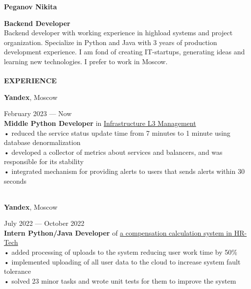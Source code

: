 \documentclass{article}
\begin{document}
\begin{vwcol}[widths={0.8,0.2},
 sep=.8cm, justify=flush,rule=0pt,indent=1em] 
\begin{spacing}{1.1}
\noindent\textbf{\Huge{Peganov Nikita}}\\
\end{spacing}
\noindent\textcolor[rgb]{0.1255,0.2902,0.7843}{\textbf{\Large{Backend Developer}}}\\
Backend developer with working experience in highload systems and project organization. Specialize in Python and Java with 3 years of production development experience. I am fond of creating IT-startups, generating ideas and learning new technologies. I prefer to work in Moscow.\\
\\
\noindent\textcolor[rgb]{0.1255,0.2902,0.7843}{\textbf{\Large{EXPERIENCE}}}\\
\begin{Large}
\textbf{Yandex}, Moscow
\end{Large}
\hspace{215pt}February 2023 — Now\\
\textbf{Middle Python Developer} in \href{https://infraevents.yandex.ru/}{Infrastructure L3 Management}\\
• reduced the service status update time from 7 minutes to 1 minute using database denormalization\\
• developed a collector of metrics about services and balancers, and was responsible for its stability\\
• integrated mechanism for providing alerts to users that sends alerts within 30 seconds\\
\\
\begin{Large}
\textbf{Yandex}, Moscow
\end{Large}
\hspace{200pt}July 2022 — October 2022\\
\textbf{Intern Python/Java Developer} of \href{https://yandex.cloud/ru/isv/hrtech}{a compensation calculation system in HR-Tech}\\
• added processing of uploads to the system reducing user work time by 50\%\\
• implemented uploading of all user data to the cloud to increase system fault tolerance\\
• solved 23 minor tasks and wrote unit tests for them to improve the system\\
\\

\end{vwcol}
\end{document}
